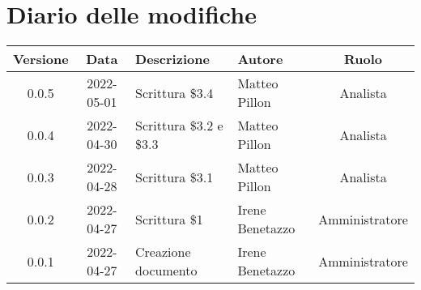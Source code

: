 \section*{Diario delle modifiche}
	\begin{center}
	\renewcommand{\arraystretch}{1.8} %
	\begin{tabular}{ |c|c|m{12em}|m{7em}|c| }
	\hline
	
	\textbf{Versione} & \textbf{Data} & \textbf{Descrizione} &  \textbf{Autore} &  \textbf{Ruolo} \\ %
	\hline
    0.0.5 & 2022-05-01 & Scrittura \$3.4 & Matteo Pillon & Analista \\ %
	\hline
    0.0.4 & 2022-04-30 & Scrittura \$3.2 e \$3.3 & Matteo Pillon & Analista \\ %
	\hline
    0.0.3 & 2022-04-28 & Scrittura \$3.1 & Matteo Pillon & Analista \\ %
	\hline
    0.0.2 & 2022-04-27 & Scrittura \$1 & Irene Benetazzo & Amministratore\\ %
	\hline
    0.0.1 & 2022-04-27 & Creazione documento & Irene Benetazzo & Amministratore\\
	\hline
	\end{tabular}
	\end{center}
	\newpage